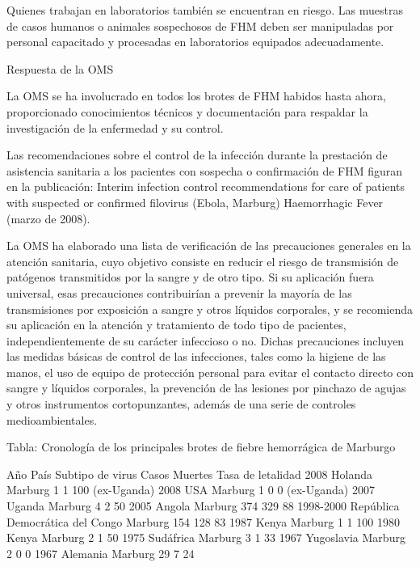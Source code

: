 Quienes trabajan en laboratorios también se encuentran en riesgo. Las muestras de casos humanos o animales sospechosos de FHM deben ser manipuladas por personal capacitado y procesadas en laboratorios equipados adecuadamente.

Respuesta de la OMS

La OMS se ha involucrado en todos los brotes de FHM habidos hasta ahora, proporcionado conocimientos técnicos y documentación para respaldar la investigación de la enfermedad y su control.

Las recomendaciones sobre el control de la infección durante la prestación de asistencia sanitaria a los pacientes con sospecha o confirmación de FHM figuran en la publicación: Interim infection control recommendations for care of patients with suspected or confirmed filovirus (Ebola, Marburg) Haemorrhagic Fever (marzo de 2008).

La OMS ha elaborado una lista de verificación de las precauciones generales en la atención sanitaria, cuyo objetivo consiste en reducir el riesgo de transmisión de patógenos transmitidos por la sangre y de otro tipo. Si su aplicación fuera universal, esas precauciones contribuirían a prevenir la mayoría de las transmisiones por exposición a sangre y otros líquidos corporales, y se recomienda su aplicación en la atención y tratamiento de todo tipo de pacientes, independientemente de su carácter infeccioso o no. Dichas precauciones incluyen las medidas básicas de control de las infecciones, tales como la higiene de las manos, el uso de equipo de protección personal para evitar el contacto directo con sangre y líquidos corporales, la prevención de las lesiones por pinchazo de agujas y otros instrumentos cortopunzantes, además de una serie de controles medioambientales.

Tabla: Cronología de los principales brotes de fiebre hemorrágica de Marburgo

Año	País	Subtipo de virus	Casos	Muertes	Tasa de letalidad
2008	Holanda	Marburg	1	1	100%
(ex-Uganda)
2008	USA	Marburg	1	0	0%
(ex-Uganda)
2007	Uganda	Marburg	4	2	50%
2005	Angola	Marburg	374	329	88%
1998-2000	República Democrática del Congo	Marburg	154	128	83%
1987	Kenya	Marburg	1	1	100%
1980	Kenya	Marburg	2	1	50%
1975	Sudáfrica	Marburg	3	1	33%
1967	Yugoslavia	Marburg	2	0	0%
1967	Alemania	Marburg	29	7	24%

%
%



\newpage
